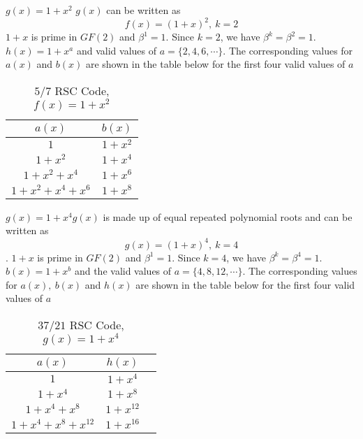 \begin{example}
$g(x)=1+x^2$\newline
$g(x)$ can be written as $$f(x)=(1+x)^2,~k=2$$ $1+x$ is prime in $GF(2)$ and $\beta^{1}=1$. Since $k=2$, we have $\beta^{k}=\beta^{2}=1$. $h(x)=1+x^a$ and valid values of $a=\{2,4,6,\cdots \}$.
The corresponding values for $a(x)$ and $b(x)$ are shown in the table below for the first four valid values of $a$

 \begin{table*}[h]
 \caption{$5/7$ RSC Code, $f(x)=1+x^2$}
\centering
\begin{tabular}{c c } 
\hline
 $a(x)$ & $b(x)$ \\ [0.5ex] 
 \hline\hline
$1$ & $1+x^2$\\ 
$1+x^2$ & $1+x^4$ \\
$1+x^2+x^4$ & $1+x^6$\\
$1+x^2+x^4+x^6$ & $1+x^8$ 
\end{tabular}
 \label{novelTab1}
\end{table*}
\end{example}

\begin{example}
$g(x)=1+x^4$\newline $g(x)$ is made up of equal repeated polynomial roots and can be written as $$g(x)=(1+x)^4,~k=4$$. $1+x$ is prime in $GF(2)$ and $\beta^{1}=1$. Since $k=4$, we have $\beta^{k}=\beta^{4}=1$. $b(x)=1+x^b$ and the valid values of $a=\{4,8,12,\cdots \}$.
The corresponding values for $a(x),~b(x)$ and $h(x)$ are shown in the table below for the first four valid values of $a$

\begin{table*}[h]
\caption{$37/21$ RSC Code, $g(x)=1+x^4$}
\centering
 \begin{tabular}{c c c} 
 \hline
$a(x)$ & $h(x)$ \\ [0.5ex] 
\hline\hline
$1$ &  $1+x^4$\\ 
$1+x^4$ & $1+x^8$ \\
$1+x^4+x^8$ & $1+x^{12}$ \\
$1+x^4+x^8+x^{12}$ & $1+x^{16}$ 
\end{tabular}
\label{novelTab4}
\end{table*}
\end{example}

